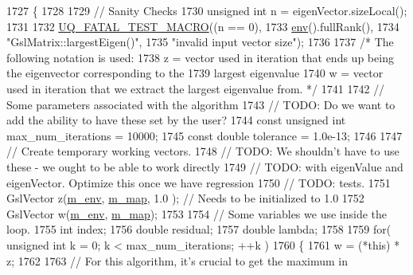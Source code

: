 \begin{DoxyCode}
1727 \{
1728 
1729   \textcolor{comment}{// Sanity Checks}
1730   \textcolor{keywordtype}{unsigned} \textcolor{keywordtype}{int} n = eigenVector.sizeLocal();
1731 
1732   \hyperlink{_defines_8h_a56d63d18d0a6d45757de47fcc06f574d}{UQ\_FATAL\_TEST\_MACRO}((n == 0),
1733                       \hyperlink{class_q_u_e_s_o_1_1_matrix_a1eefeca9f35200e8275fb0fdfa0c8684}{env}().fullRank(),
1734                       \textcolor{stringliteral}{"GslMatrix::largestEigen()"},
1735                       \textcolor{stringliteral}{"invalid input vector size"});
1736 
1737   \textcolor{comment}{/* The following notation is used:}
1738 \textcolor{comment}{     z = vector used in iteration that ends up being the eigenvector corresponding to the}
1739 \textcolor{comment}{         largest eigenvalue}
1740 \textcolor{comment}{     w = vector used in iteration that we extract the largest eigenvalue from.  */}
1741 
1742   \textcolor{comment}{// Some parameters associated with the algorithm}
1743   \textcolor{comment}{// TODO: Do we want to add the ability to have these set by the user?}
1744   \textcolor{keyword}{const} \textcolor{keywordtype}{unsigned} \textcolor{keywordtype}{int} max\_num\_iterations = 10000;
1745   \textcolor{keyword}{const} \textcolor{keywordtype}{double} tolerance = 1.0e-13;
1746 
1747   \textcolor{comment}{// Create temporary working vectors.}
1748   \textcolor{comment}{// TODO: We shouldn't have to use these - we ought to be able to work directly}
1749   \textcolor{comment}{// TODO: with eigenValue and eigenVector. Optimize this once we have regression}
1750   \textcolor{comment}{// TODO: tests.}
1751   GslVector z(\hyperlink{class_q_u_e_s_o_1_1_matrix_a247fb0fc0b87fecdee054bb4660b68e8}{m\_env}, \hyperlink{class_q_u_e_s_o_1_1_matrix_adb42d344c0b2859c3b4a4f5a3dd7875f}{m\_map}, 1.0 ); \textcolor{comment}{// Needs to be initialized to 1.0}
1752   GslVector w(\hyperlink{class_q_u_e_s_o_1_1_matrix_a247fb0fc0b87fecdee054bb4660b68e8}{m\_env}, \hyperlink{class_q_u_e_s_o_1_1_matrix_adb42d344c0b2859c3b4a4f5a3dd7875f}{m\_map});
1753 
1754   \textcolor{comment}{// Some variables we use inside the loop.}
1755   \textcolor{keywordtype}{int} index;
1756   \textcolor{keywordtype}{double} residual;
1757   \textcolor{keywordtype}{double} lambda;
1758 
1759   \textcolor{keywordflow}{for}( \textcolor{keywordtype}{unsigned} \textcolor{keywordtype}{int} k = 0; k < max\_num\_iterations; ++k )
1760     \{
1761       w = (*this) * z;
1762 
1763       \textcolor{comment}{// For this algorithm, it's crucial to get the maximum in}

\end{DoxyCode}
